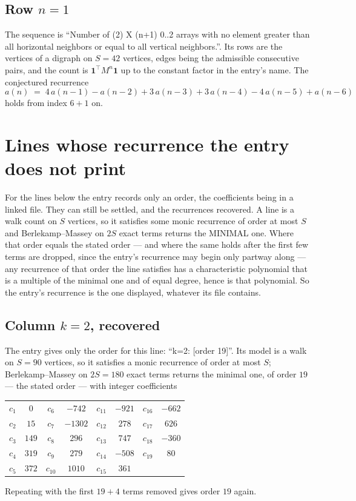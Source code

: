 \documentclass[11pt,a4paper]{article}
\theoremstyle{plain}
\theoremstyle{definition}
\begin{document}
\subsection*{Row $n$$=1$}
The sequence is ``Number of (2) X (n+1) 0..2 arrays with no element greater than all horizontal neighbors or equal to all vertical neighbors.''. Its rows are the vertices of a digraph on
$S=42$ vertices, edges being the admissible consecutive pairs, and the count is
$\mathbf{1}^{\!\top}M^{n}\mathbf{1}$ up to the constant factor in the entry's name.
The conjectured recurrence
\[
a(n)\;=\;4\,a(n-1) - a(n-2) + 3\,a(n-3) + 3\,a(n-4) - 4\,a(n-5) + a(n-6)
\]
holds from index $6+1$ on.


\section{Lines whose recurrence the entry does not print}

For the lines below the entry records only an order, the coefficients being in a linked file.
They can still be settled, and the recurrences recovered. A line is a walk count on $S$
vertices, so it satisfies some monic recurrence of order at most $S$ and Berlekamp--Massey on
$2S$ exact terms returns the MINIMAL one. Where that order equals the stated order --- and
where the same holds after the first few terms are dropped, since the entry's recurrence may
begin only partway along --- any recurrence of that order the line satisfies has a
characteristic polynomial that is a multiple of the minimal one and of equal degree, hence is
that polynomial. So the entry's recurrence is the one displayed, whatever its file contains.

\subsection*{Column $k=2$, recovered}
The entry gives only the order for this line: ``k=2: [order 19]''. Its model is a walk on
$S=90$ vertices, so it satisfies a monic recurrence of order at most $S$;
Berlekamp--Massey on $2S=180$ exact terms returns the minimal one, of order
$19$ --- the stated order --- with integer coefficients
\begin{center}\small\begin{tabular}{cccccccc}
$c_{1}$ & $0$ & $c_{6}$ & $-742$ & $c_{11}$ & $-921$ & $c_{16}$ & $-662$ \\
$c_{2}$ & $15$ & $c_{7}$ & $-1302$ & $c_{12}$ & $278$ & $c_{17}$ & $626$ \\
$c_{3}$ & $149$ & $c_{8}$ & $296$ & $c_{13}$ & $747$ & $c_{18}$ & $-360$ \\
$c_{4}$ & $319$ & $c_{9}$ & $279$ & $c_{14}$ & $-508$ & $c_{19}$ & $80$ \\
$c_{5}$ & $372$ & $c_{10}$ & $1010$ & $c_{15}$ & $361$ &  &  \\
\end{tabular}\end{center}
Repeating with the first $19+4$ terms removed gives order $19$ again.
\end{document}

